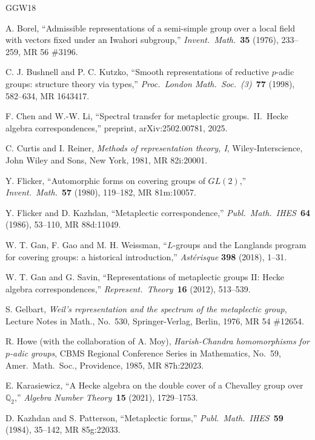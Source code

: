 \documentclass[12pt,letterpaper,reqno]{amsart}
\theoremstyle{definition}
\theoremstyle{remark}
\numberwithin{equation}{section}
\begin{document}
\begin{thebibliography}{GGW18}

 A. Borel, ``Admissible representations of a semi-simple group
over a local field with vectors fixed under an Iwahori subgroup,''
\emph{Invent.\ Math.}\ \textbf{35} (1976), 233--259, MR 56 \#3196.

 C. J. Bushnell and P. C. Kutzko, ``Smooth representations of
reductive $p$-adic groups: structure theory via types,'' \emph{Proc.\ London
Math.\ Soc.\ (3)}\ \textbf{77} (1998), 582--634, MR 1643417.

 F. Chen and W.-W. Li, ``Spectral transfer for metaplectic
groups.\ II.\ Hecke algebra correspondences,'' preprint,
arXiv:2502.00781, 2025.

 C. Curtis and I. Reiner, \emph{Methods of representation
theory, I}, Wiley-Interscience, John Wiley and Sons, New York, 1981,
MR 82i:20001.

 Y. Flicker, ``Automorphic forms on covering groups of
$GL(2)$,'' \emph{Invent.\ Math.}\ \textbf{57} (1980), 119--182, MR 81m:10057.

 Y. Flicker and D. Kazhdan, ``Metaplectic correspondence,''
\emph{Publ.\ Math.\ IHES}\ \textbf{64} (1986), 53--110, MR 88d:11049.

 W. T. Gan, F. Gao and M. H. Weissman, ``$L$-groups and
the Langlands program for covering groups: a historical introduction,''
\emph{Ast\'erisque} \textbf{398} (2018), 1--31.

 W. T. Gan and G. Savin, ``Representations of metaplectic
groups II: Hecke algebra correspondences,'' \emph{Represent.\ Theory}\
\textbf{16} (2012), 513--539.

 S. Gelbart, \emph{Weil's representation and the spectrum of the
metaplectic group}, Lecture Notes in Math., No.\ 530, Springer-Verlag, Berlin,
1976, MR 54 \#12654.

 R. Howe (with the collaboration of A. Moy),
\emph{Harish-Chandra homomorphisms for $p$-adic groups}, CBMS Regional
Conference Series in Mathematics, No.\ 59, Amer.\ Math.\ Soc., Providence,
1985, MR 87h:22023.

 E. Karasiewicz, ``A Hecke algebra on the double cover of
a Chevalley group over $\mathbb{Q}_2$,'' \emph{Algebra Number Theory}\
\textbf{15} (2021), 1729--1753.

 D. Kazhdan and S. Patterson, ``Metaplectic forms,''
\emph{Publ.\ Math.\ IHES}\ \textbf{59} (1984), 35--142, MR 85g:22033.


\end{thebibliography}
\end{document}
